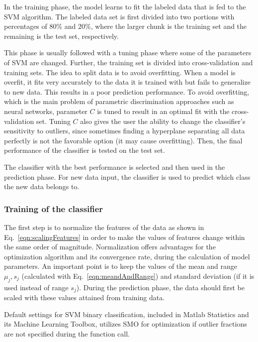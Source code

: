 In the training phase, the model learns to fit the labeled data that is fed to the SVM algorithm. The labeled data set is first divided into two portions with percentages of 80\% and 20\%, where the larger chunk is the training set and the remaining is the test set, respectively.

This phase is usually followed with a tuning phase where some of the parameters of SVM are changed. Further, the training set is divided into cross-validation and training sets. The idea to split data is to avoid overfitting. When a model is overfit, it fits very accurately to the data it is trained with but fails to generalize to new data. This results in a poor prediction performance. To avoid overfitting, which is the main problem of parametric discrimination approaches such as neural networks, parameter $C$ is tuned to result in an optimal fit with the cross-validation set. Tuning $C$ also gives the user the ability to change the classifier's sensitivity to outliers, since sometimes finding a hyperplane separating all data perfectly is not the favorable option (it may cause overfitting). Then, the final performance of the classifier is tested on the test set. 

The classifier with the best performance is selected and then used in the prediction phase.  
For new data input, the classifier is used to predict which class the new data belongs to.

\subsubsection{Training of the classifier}

The first step is to normalize the features of the data as shown in Eq.~\ref{eqn:scalingFeatures} in order to make the values of features change within the same order of magnitude. 
Normalization offers advantages for the optimization algorithm and its convergence rate, during the calculation of model parameters.  
An important point is to keep the values of the mean and range $\mu_j, s_j$ (calculated with Eq.~\ref{eqn:meandAndRange}) and standard deviation (if it is used instead of range $s_j$). 
During the prediction phase, the data should first be scaled with these values attained from training data.

Default settings for SVM binary classification, included in Matlab Statistics and its Machine Learning Toolbox, utilizes SMO for optimization if outlier fractions are not specified during the function call. 


